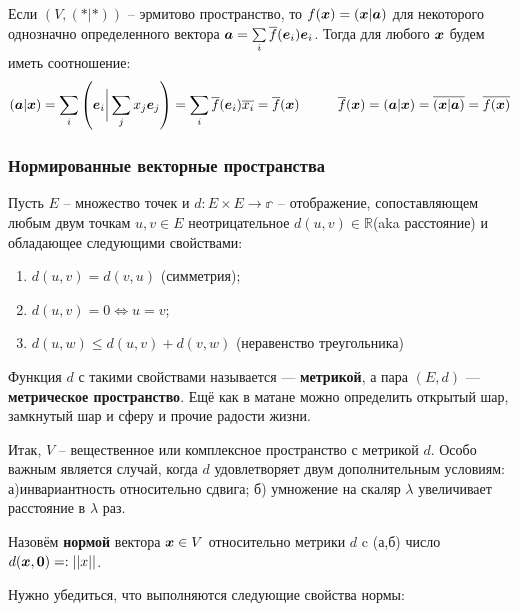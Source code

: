 Если $(V,(*|*))$ -- эрмитово пространство, то $f(\mbox{\boldmath $x$}) = (\mbox{\boldmath $x$}|\mbox{\boldmath $a$})$ для некоторого однозначно определенного вектора $\mbox{\boldmath $a$} = \sum\limits_{ i }^{ } \overline{f}(\mbox{\boldmath $e$}_i) \mbox{\boldmath $e$}_i$. Тогда для любого $\mbox{\boldmath $x$}$ будем иметь соотношение:
$$
(\mbox{\boldmath $a$}|\mbox{\boldmath $x$}) = \sum\limits_{ i }^{   } \left(\mbox{\boldmath $e$}_i \bigg| \sum\limits_{ j }^{   } x_j \mbox{\boldmath $e$}_j\right) = \sum\limits_{ i }^{   } \overline{f}(\mbox{\boldmath $e$}_i) \overline{x_i} = \overline{f}(\mbox{\boldmath $x$})
\hspace{1cm}
\overline{f}(\mbox{\boldmath $x$}) = (\mbox{\boldmath $a$}|\mbox{\boldmath $x$}) = \overline{(\mbox{\boldmath $x$}|\mbox{\boldmath $a$})} =	\overline{f(\mbox{\boldmath $x$})}
$$

\subsubsection{Нормированные векторные пространства}
\begin{to_def} 
	Пусть $E$ -- множество точек и $d\colon E \times E \to \mathbb{r}$ -- отображение, сопоставляющем любым двум точкам $u,v \in E$ неотрицательное $d(u,v) \in \mathbb{R}$(aka расстояние) и обладающее следующими свойствами:

	\begin{enumerate}[label = \roman*)]
		\item $d (u,v) = d(v,u)$ (симметрия);
		
		\item $d(u,v) = 0 \Longleftrightarrow u = v$;
		
		\item $d(u,w) \leq d(u,v) + d(v,w)$ (неравенство треугольника) 
	\end{enumerate}

	Функция $d$ с такими свойствами называется --- \textbf{метрикой}, а пара $(E,d)$ --- \textbf{метрическое пространство}.
	Ещё как в матане можно определить открытый шар, замкнутый шар и сферу и прочие радости жизни.
\end{to_def}


Итак, $V$ -- вещественное или комплексное пространство с метрикой $d$.
Особо важным является случай, когда $d$ удовлетворяет двум дополнительным условиям: а)инвариантность относительно сдвига; б) умножение на скаляр $\lambda$ увеличивает расстояние в $\lambda$ раз.

\begin{to_def} 
	Назовём \textbf{нормой} вектора $\mbox{\boldmath $x$} \in V$ относительно метрики $d$ c (а,б) число $d(\mbox{\boldmath $x$}, \mbox{\boldmath $0$}) =:||x||$.
\end{to_def}

Нужно убедиться, что выполняются следующие свойства нормы:

